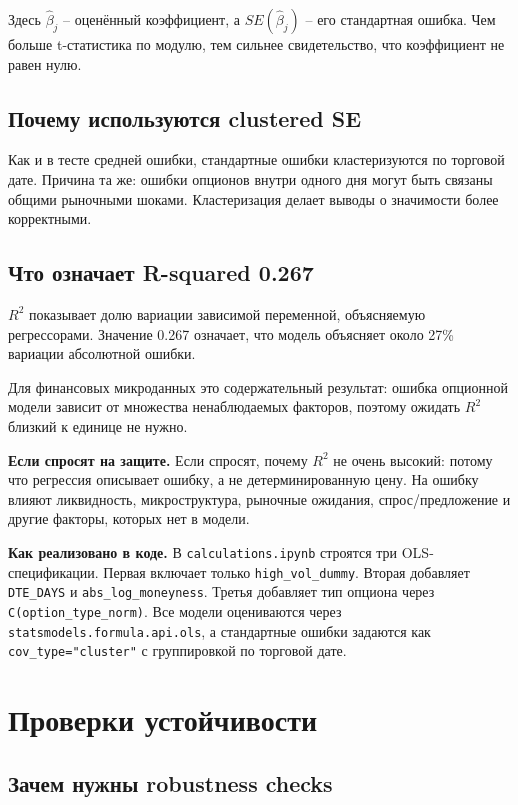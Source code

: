 \documentclass[11pt,a4paper]{article}
\newcommand{\answer}[1]{%
  \vspace{0.15em}
  \noindent\colorbox{softgreen}{%
    \parbox{\dimexpr\linewidth-2\fboxsep\relax}{\textbf{Если спросят на защите.} #1}%
  }\vspace{0.2em}
}
\newcommand{\impl}[1]{%
  \vspace{0.15em}
  \noindent\colorbox{softblue}{%
    \parbox{\dimexpr\linewidth-2\fboxsep\relax}{\textbf{Как реализовано в коде.} #1}%
  }\vspace{0.2em}
}
\begin{document}
Здесь $\hat{\beta}_j$ -- оценённый коэффициент, а $SE(\hat{\beta}_j)$ -- его стандартная ошибка. Чем больше t-статистика по модулю, тем сильнее свидетельство, что коэффициент не равен нулю.

\subsection{Почему используются clustered SE}

Как и в тесте средней ошибки, стандартные ошибки кластеризуются по торговой дате. Причина та же: ошибки опционов внутри одного дня могут быть связаны общими рыночными шоками. Кластеризация делает выводы о значимости более корректными.

\subsection{Что означает R-squared 0.267}

$R^2$ показывает долю вариации зависимой переменной, объясняемую регрессорами. Значение 0.267 означает, что модель объясняет около 27\% вариации абсолютной ошибки.

Для финансовых микроданных это содержательный результат: ошибка опционной модели зависит от множества ненаблюдаемых факторов, поэтому ожидать $R^2$ близкий к единице не нужно.

\answer{Если спросят, почему $R^2$ не очень высокий: потому что регрессия описывает ошибку, а не детерминированную цену. На ошибку влияют ликвидность, микроструктура, рыночные ожидания, спрос/предложение и другие факторы, которых нет в модели.}

\impl{В \texttt{calculations.ipynb} строятся три OLS-спецификации. Первая включает только \texttt{high\_vol\_dummy}. Вторая добавляет \texttt{DTE\_DAYS} и \texttt{abs\_log\_moneyness}. Третья добавляет тип опциона через \texttt{C(option\_type\_norm)}. Все модели оцениваются через \texttt{statsmodels.formula.api.ols}, а стандартные ошибки задаются как \texttt{cov\_type="cluster"} с группировкой по торговой дате.}

\section{Проверки устойчивости}

\subsection{Зачем нужны robustness checks}
\end{document}
